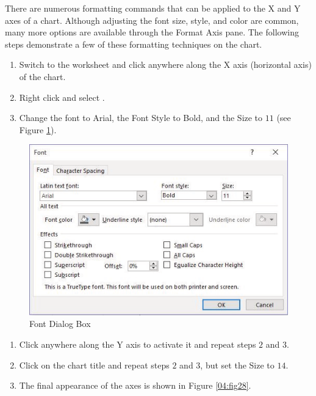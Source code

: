 There are numerous formatting commands that can be applied to the X and Y axes of a chart. Although adjusting the font size, style, and color are common, many more options are available through the Format Axis pane. The following steps demonstrate a few of these formatting techniques on the  chart.

\begin{enumerate}
	\item Switch to the  worksheet and click anywhere along the X axis (horizontal axis) of the  chart.
	\item Right click and select .
	\item Change the font to Arial, the Font Style to Bold, and the Size to $ 11 $ (see Figure \ref{04:fig27}).
\end{enumerate}

\begin{figure}[H]
	\centering
	\includegraphics[width=\maxwidth{.95\linewidth}]{gfx/ch04_fig27}
	\caption{Font Dialog Box}
	\label{04:fig27}
\end{figure}

\begin{enumerate}[resume]
	\item Click anywhere along the Y axis to activate it and repeat steps $ 2 $ and $ 3 $.
	\item Click on the chart title and repeat steps $ 2 $ and $ 3 $, but set the Size to $ 14 $.
	\item The final appearance of the axes is shown in Figure \ref{04:fig28}.
\end{enumerate}

